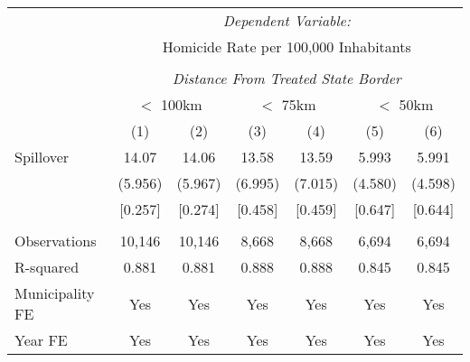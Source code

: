\documentclass[]{article}
\begin{document}
\begin{table}[htbp]
\centering
\begin{tabular}{lcccccc} \toprule
& \multicolumn{6}{c}{\textit{Dependent Variable:}} \\
& \multicolumn{6}{c}{Homicide Rate per 100,000 Inhabitants} \\
\cmidrule(lr){2-7} \\
& \multicolumn{6}{c}{\textit{Distance From Treated State Border}} \\
\cmidrule{2-7}
& \multicolumn{2}{c}{$<$ 100km} & \multicolumn{2}{c}{$<$ 75km} & \multicolumn{2}{c}{$<$ 50km} \\
\cmidrule(lr){2-3} \cmidrule(lr){4-5} \cmidrule(lr){6-7}
& (1) & (2) & (3) & (4) & (5) & (6) \\
\midrule
Spillover & 14.07 & 14.06 & 13.58 & 13.59 & 5.993 & 5.991 \\
 & (5.956) & (5.967) & (6.995) & (7.015) & (4.580) & (4.598) \\
 & [0.257]  & [0.274]  & [0.458]  & [0.459]  & [0.647]  & [0.644] \\\\
\midrule
Observations & 10,146 & 10,146 & 8,668 & 8,668 & 6,694 & 6,694 \\
R-squared & 0.881 & 0.881 & 0.888 & 0.888 & 0.845 & 0.845 \\
Municipality FE & Yes & Yes & Yes & Yes & Yes & Yes \\
Year FE & Yes & Yes & Yes & Yes & Yes & Yes \\
\bottomrule
\end{tabular}
\end{table}
\end{document}
